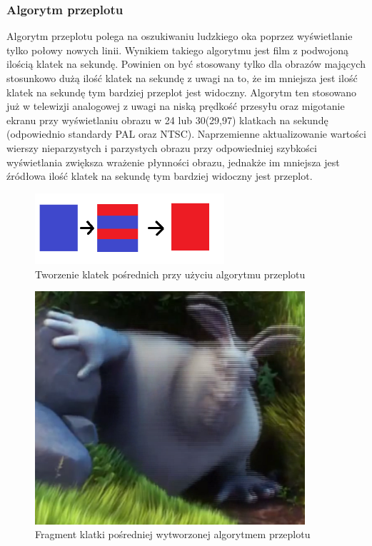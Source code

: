 \documentclass[twoside]{projektInzynierskiMS}
\begin{document}
\subsubsection{Algorytm przeplotu}
Algorytm przeplotu polega na oszukiwaniu ludzkiego oka poprzez wyświetlanie tylko połowy nowych linii. Wynikiem takiego algorytmu jest film z podwojoną ilością klatek na sekundę. Powinien on być stosowany tylko dla obrazów mających stosunkowo dużą ilość klatek na sekundę z uwagi na to, że im mniejsza jest ilość klatek na sekundę tym bardziej przeplot jest widoczny. Algorytm ten stosowano już w telewizji analogowej z uwagi na niską prędkość przesyłu oraz migotanie ekranu przy wyświetlaniu obrazu w 24 lub 30(29,97) klatkach na sekundę (odpowiednio standardy PAL oraz NTSC). Naprzemienne aktualizowanie wartości wierszy nieparzystych i parzystych obrazu przy odpowiedniej szybkości wyświetlania zwiększa wrażenie płynności obrazu, jednakże im mniejsza jest źródłowa ilość klatek na sekundę tym bardziej widoczny jest przeplot.

\begin{figure}[h]
\centering
\includegraphics[width=7cm]{Interlace.png}
\caption{Tworzenie klatek pośrednich przy użyciu algorytmu przeplotu}
\end{figure}

\begin{figure}[h]
\centering
\includegraphics[width=10cm]{InterlaceBunny.png}
\caption{Fragment klatki pośredniej wytworzonej algorytmem przeplotu}
\label{fig:fpsInterlace}
\end{figure}
\end{document}
